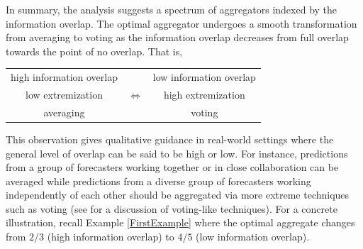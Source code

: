 \documentclass[12pt]{article}
\newtheorem{observation}[theorem]{Observation}
\newtheorem{proposition}[theorem]{Proposition}
\theoremstyle{definition}
\theoremstyle{definition}
\begin{document}
In summary, the analysis suggests a spectrum of aggregators indexed by
the information overlap.  The optimal aggregator undergoes a smooth
transformation from averaging to voting as
the information overlap decreases from full overlap towards the point
of no overlap.
That is,
\begin{center}
\vspace{-1em}
\singlespacing
\begin{tabular}{ccc}
high information overlap & & low information overlap\\
low extremization & {\Large $\Longleftrightarrow$} & high extremization \\
averaging  & & voting\\
\end{tabular}
\end{center}
This observation gives qualitative guidance in real-world settings
where the general level of overlap can be said to be high or low.  For
instance, predictions from a group of forecasters working together or in
close collaboration can be averaged while predictions from a diverse
group of forecasters working independently of each other should be
aggregated via more extreme techniques such as voting (see \citealt{parunak2013characterizing} for a discussion of voting-like techniques). For a concrete illustration, recall  Example \ref{FirstExample} where the optimal aggregate changes from $2/3$ (high information overlap) to $4/5$ (low information overlap). 



%
\end{document}
